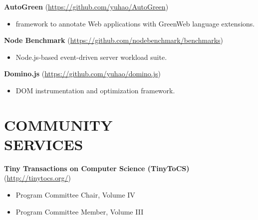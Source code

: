\documentclass[margin, 9pt]{res} %
\begin{document}
\begin{resume}
\medskip
\textbf{AutoGreen} (\url{https://github.com/yuhao/AutoGreen})
\begin{itemize}[leftmargin=*] \itemsep -3pt
\vspace*{-4pt}
  \item framework to annotate Web applications with GreenWeb language extensions. \par
\end{itemize}

\medskip
\textbf{Node Benchmark} (\url{https://github.com/nodebenchmark/benchmarks})
\begin{itemize}[leftmargin=*] \itemsep -3pt
\vspace*{-4pt}
	\item Node.js-based event-driven server workload suite. \par
\end{itemize}

\medskip
\textbf{Domino.js} (\url{https://github.com/yuhao/domino.js})
\begin{itemize}[leftmargin=*] \itemsep -3pt
\vspace*{-4pt}
	\item DOM instrumentation and optimization framework. \par
\end{itemize}


\section{COMMUNITY\\ SERVICES}

\textbf{Tiny Transactions on Computer Science (TinyToCS)} (\url{http://tinytocs.org/})
\begin{itemize}[leftmargin=*] \itemsep -3pt
\vspace*{-4pt}
	\item Program Committee Chair, Volume IV \par
	\item Program Committee Member, Volume III \par
\end{itemize}


\end{resume}
\end{document}

